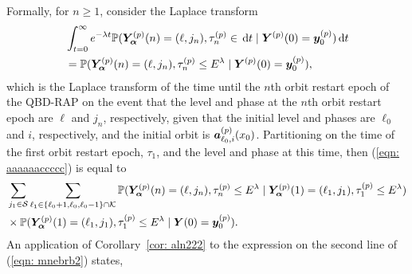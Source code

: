 Formally, for \(n\geq 1\), consider the Laplace transform 
\begin{align}
	&\int_{t=0}^\infty e^{-\lambda t} \mathbb P(\bm{Y}_{\bm{\alpha}}^{(p)}(n) = (\ell, j_n), \tau_{n}^{(p)}\in \, \mathrm{d} t
	 \mid \boldsymbol Y^{(p)}(0)=\boldsymbol y_0^{(p)}) \, \mathrm{d} t \nonumber 
	 \\&=\mathbb P(\bm{Y}_{\bm{\alpha}}^{(p)}(n) = (\ell, j_n), \tau_{n}^{(p)}\leq E^{\lambda}
	 \mid \boldsymbol Y^{(p)}(0)=\boldsymbol y_0^{(p)}),\label{eqn: aaaaaaccccc} 
\end{align}
which is the Laplace transform of the time until the \(n\)th orbit restart epoch of the QBD-RAP on the event that the level and phase at the \(n\)th orbit restart epoch are \(\ell\) and \(j_n\), respectively, given that the initial level and phases are \(\ell_0\) and \(i\), respectively, and the initial orbit is \(\boldsymbol a_{\ell_0,i}^{(p)}(x_0)\). Partitioning on the time of the first orbit restart epoch, \(\tau_1\), and the level and phase at this time, then (\ref{eqn: aaaaaaccccc}) is equal to 
\begin{align}
	&\sum_{j_1\in\mathcal S}\sum_{\ell_1\in\{\ell_0+1,\ell_0,\ell_0-1\}\cap \mathcal K}\mathbb P(\bm{Y}_{\bm{\alpha}}^{(p)}(n) = (\ell, j_n), \tau_{n}^{(p)}\leq E^\lambda 
	 \mid \bm{Y}_{\bm{\alpha}}^{(p)}(1)=(\ell_1, j_1), \tau_1^{(p)}\leq E^\lambda ) \nonumber
	 \\&\times \mathbb P(\bm{Y}_{\bm{\alpha}}^{(p)}(1)=(\ell_1, j_1), \tau_{1}^{(p)}\leq E^\lambda
	 \mid \boldsymbol Y(0)=\boldsymbol y_0^{(p)}).
	 \label{eqn: mnebrb2}
\end{align}
An application of Corollary~\ref{cor: aln222} to the expression on the second line of (\ref{eqn: mnebrb2}) states, 
